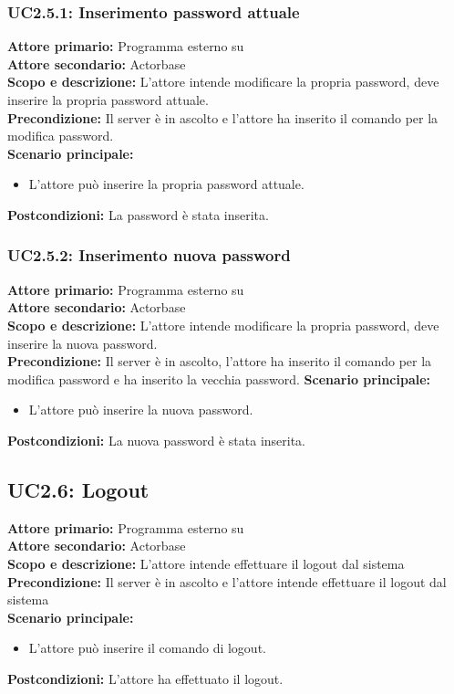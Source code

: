 \documentclass{scalatekids-article}
\begin{document}
\subsubsection{UC2.5.1: Inserimento password attuale}

\textbf{Attore primario:} Programma esterno su \\
\textbf{Attore secondario:} Actorbase\\
\textbf{Scopo e descrizione:} L'attore intende modificare la propria password, deve inserire la propria password attuale.\\
\textbf{Precondizione:} Il server è in ascolto e l'attore ha inserito il comando per la modifica password.\\
\textbf{Scenario principale:}
\begin{itemize}
\item L'attore può inserire la propria password attuale.
\end{itemize}
\textbf{Postcondizioni:} La password è stata inserita.

\subsubsection{UC2.5.2: Inserimento nuova password}

\textbf{Attore primario:} Programma esterno su \\
\textbf{Attore secondario:} Actorbase\\
\textbf{Scopo e descrizione:} L'attore intende modificare la propria password, deve inserire la nuova password.\\
\textbf{Precondizione:} Il server è in ascolto, l'attore ha inserito il comando per la modifica password e ha inserito la vecchia password.
\textbf{Scenario principale:}
\begin{itemize}
\item L'attore può inserire la nuova password.
\end{itemize}
\textbf{Postcondizioni:} La nuova password è stata inserita.

\subsection{UC2.6: Logout}

\textbf{Attore primario:} Programma esterno su \\
\textbf{Attore secondario:} Actorbase\\
\textbf{Scopo e descrizione:} L'attore intende effettuare il logout dal sistema\\
\textbf{Precondizione:} Il server è in ascolto e l'attore intende effettuare il logout dal sistema\\
\textbf{Scenario principale:}
\begin{itemize}
\item L'attore può inserire il comando di logout.
\end{itemize}
\textbf{Postcondizioni:} L'attore ha effettuato il logout.
\end{document}

